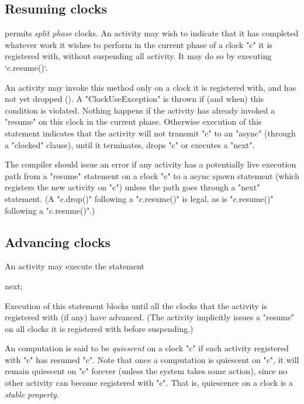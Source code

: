 
\subsection{Resuming clocks}\label{resume}\label{sec:clock:resume}
\Xten{} permits {\em split phase} clocks. An activity may wish
to indicate that it has completed whatever work it wishes to perform
in the current phase of a  clock \xcd"c" it is registered with, without
suspending all activity. It may do so  by executing 
\xcd`c.resume()`.



An activity may invoke this method only on a clock it is registered
with, and has not yet dropped (). A \xcd"ClockUseException" is thrown if (and
when) this condition is violated.  Nothing happens if the activity has
already invoked a \xcd"resume" on this clock in the current phase.
Otherwise execution of this statement indicates that the activity will
not transmit \xcd"c" to an \xcd"async" (through a \xcd"clocked"
clause),
until it terminates, drops \xcd"c" or executes a \xcd"next". 

\begin{staticrule*}
The compiler should issue an error if any activity has a potentially
live execution path from a \xcd"resume" statement on a clock \xcd"c"
to a
async spawn statement (which registers the new
activity on \xcd"c") unless the path goes through a \xcd"next"
statement. (A \xcd"c.drop()" following a \xcd"c.resume()" is legal,
as is \xcd"c.resume()" following a \xcd"c.resume()".)
\end{staticrule*}

\subsection{Advancing clocks}\label{sec:clock:next}
An activity may execute the statement
\begin{xten}
next;
\end{xten}

\noindent 
Execution of this statement blocks until all the clocks that the
activity is registered with (if any) have advanced. (The activity
implicitly issues a \xcd"resume" on all clocks it is registered
with before suspending.)

An \Xten{} computation is said to be {\em quiescent} on a clock
\xcd"c" if each activity registered with \xcd"c" has resumed \xcd"c".
Note that once a computation is quiescent on \xcd"c", it will remain
quiescent on \xcd"c" forever (unless the system takes some action),
since no other activity can become registered with \xcd"c".  That is,
quiescence on a clock is a {\em stable property}.


